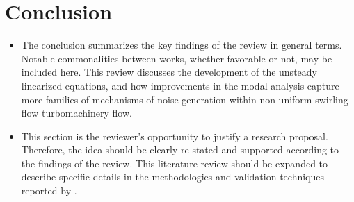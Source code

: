 \documentclass[conf]{new-aiaa}
\begin{document}
\section{Conclusion}
\begin{itemize}
	\item The conclusion summarizes the key findings of the review in general terms. Notable commonalities between works, whether favorable or not, may be included here.
	\subitem This review discusses the development of the unsteady linearized equations, and how improvements in the modal analysis capture more families of mechanisms of noise generation within non-uniform swirling flow turbomachinery flow. 
	\item This section is the reviewer’s opportunity to justify a research proposal. Therefore, the idea should be clearly re-stated and supported according to the findings of the review.
	\subitem This literature review should be expanded to describe specific details in the methodologies and validation techniques reported by \cite{Kousen1996,Kousen1999,Golubev1996,Golubev1998}. 
\end{itemize}

\end{document}
